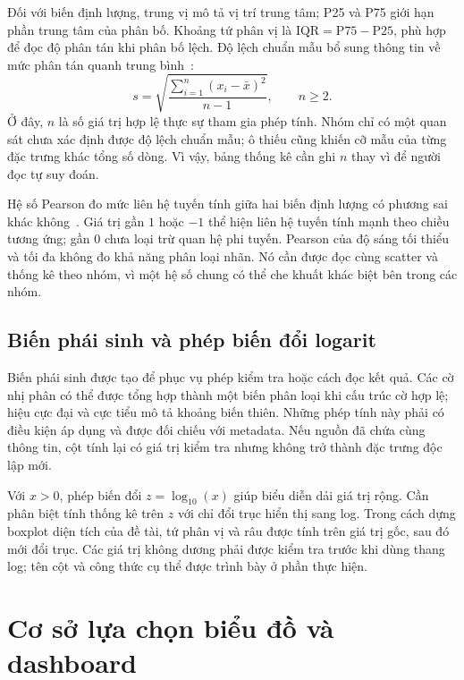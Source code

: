 \documentclass[12pt,a4paper,oneside]{report}
\begin{document}
Đối với biến định lượng, trung vị mô tả vị trí trung tâm; P25 và P75 giới hạn phần trung tâm của phân bố. Khoảng tứ phân vị là $\mathrm{IQR}=\mathrm{P75}-\mathrm{P25}$, phù hợp để đọc độ phân tán khi phân bố lệch. Độ lệch chuẩn mẫu bổ sung thông tin về mức phân tán quanh trung bình~\cite{nistbox}:
\begin{equation}
  s=\sqrt{\frac{\sum_{i=1}^{n}(x_i-\bar{x})^2}{n-1}},
  \qquad n\geq2.
  \label{eq:dolechchuan}
\end{equation}
Ở đây, $n$ là số giá trị hợp lệ thực sự tham gia phép tính. Nhóm chỉ có một quan sát chưa xác định được độ lệch chuẩn mẫu; ô thiếu cũng khiến cỡ mẫu của từng đặc trưng khác tổng số dòng. Vì vậy, bảng thống kê cần ghi $n$ thay vì để người đọc tự suy đoán.

Hệ số Pearson đo mức liên hệ tuyến tính giữa hai biến định lượng có phương sai khác không~\cite{niststats}. Giá trị gần $1$ hoặc $-1$ thể hiện liên hệ tuyến tính mạnh theo chiều tương ứng; gần $0$ chưa loại trừ quan hệ phi tuyến. Pearson của độ sáng tối thiểu và tối đa không đo khả năng phân loại nhãn. Nó cần được đọc cùng scatter và thống kê theo nhóm, vì một hệ số chung có thể che khuất khác biệt bên trong các nhóm.

\subsection{Biến phái sinh và phép biến đổi logarit}

Biến phái sinh được tạo để phục vụ phép kiểm tra hoặc cách đọc kết quả. Các cờ nhị phân có thể được tổng hợp thành một biến phân loại khi cấu trúc cờ hợp lệ; hiệu cực đại và cực tiểu mô tả khoảng biến thiên. Những phép tính này phải có điều kiện áp dụng và được đối chiếu với metadata. Nếu nguồn đã chứa cùng thông tin, cột tính lại có giá trị kiểm tra nhưng không trở thành đặc trưng độc lập mới.

Với $x>0$, phép biến đổi $z=\log_{10}(x)$ giúp biểu diễn dải giá trị rộng. Cần phân biệt tính thống kê trên $z$ với chỉ đổi trục hiển thị sang log. Trong cách dựng boxplot diện tích của đề tài, tứ phân vị và râu được tính trên giá trị gốc, sau đó mới đổi trục. Các giá trị không dương phải được kiểm tra trước khi dùng thang log; tên cột và công thức cụ thể được trình bày ở phần thực hiện.

\section{Cơ sở lựa chọn biểu đồ và dashboard}
\label{sec:bieudodashboard}
\end{document}

